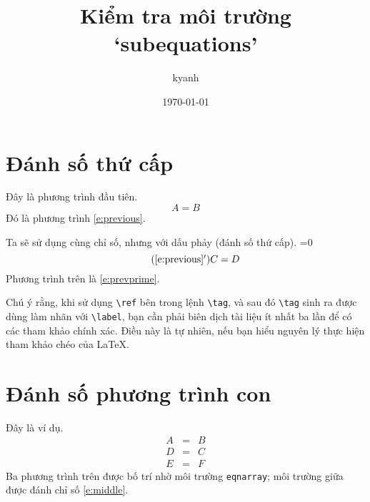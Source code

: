 \documentclass[fleqn]{article}
\title{Kiểm tra môi trường `subequations'}
\author{kyanh}
\date{\today}
\makeatletter
\numberwithin{equation}{section}
\newcommand{\env}[1]{{\normalfont\texttt{#1}}}
\newcommand{\multipasswarning}{%
  \clearpage
  \typeout{%
  **********************************************************************}
  \typeout{%
  Note: This document needs to run through LaTeX three times, instead of}
  \typeout{%
  the usual two, to resolve indirect cross-references.}
  \typeout{%
  **********************************************************************}
}
\def\checkref{\begingroup
  \@ifundefined{r@check}{\def\@currentlabel{0}}{\def\@currentlabel{1}}%
  \ifnum1=0\expandafter\@firstoftwo\r@check\relax
    \global\let\multipasswarning\relax
  \fi
  \label{check}%
  \endgroup}
\makeatother
\begin{document}
\maketitle

\section{Đánh số thứ cấp}

Đây là phương trình đầu tiên.
\begin{equation}\label{e:previous}
A=B
\end{equation}
Đó là phương trình \eqref{e:previous}.

Ta sẽ sử dụng cùng chỉ số, nhưng với dấu phảy (đánh số thứ cấp).\checkref
\begin{equation}
\tag{\ref{e:previous}$'$}\label{e:prevprime}
C=D
\end{equation}
Phương trình trên là \eqref{e:prevprime}.

\medskip 
Chú ý rằng, khi sử dụng \verb"\ref" bên trong lệnh \verb"\tag",
và sau đó \verb"\tag" sinh ra được dùng làm nhãn với \verb"\label", bạn
cần phải biên dịch tài liệu ít nhất ba lần để có các tham khảo chính xác.
Điều này là tự nhiên, nếu bạn hiểu nguyên lý thực hiện tham khảo chéo của \LaTeX{}.


\section{Đánh số phương trình con}

Đây là ví dụ.
\begin{subequations}
\begin{eqnarray}
A&=&B\\
D&=&C \label{e:middle}\\
E&=&F
\end{eqnarray}
\end{subequations}
Ba phương trình trên được bố trí nhờ môi trường \env{eqnarray};
môi trường giữa được đánh chỉ số \eqref{e:middle}.
\end{document}
